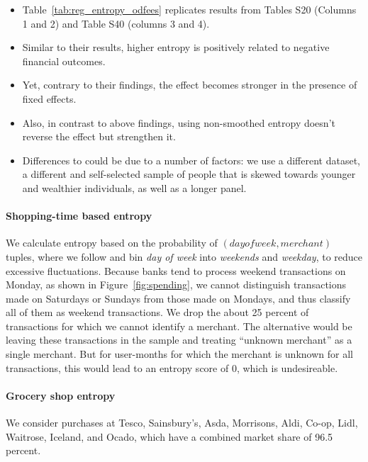\begin{itemize}

    \item Table~\ref{tab:reg_entropy_odfees} replicates results from
        \citet{muggleton2020evidence} Tables S20 (Columns 1 and 2) and Table
        S40 (columns 3 and 4).

    \item Similar to their results, higher entropy is positively related to
        negative financial outcomes.

    \item Yet, contrary to their findings, the effect becomes stronger in the
        presence of fixed effects.

    \item Also, in contrast to above findings, using non-smoothed entropy
        doesn't reverse the effect but strengthen it.

    \item Differences to \citet{muggleton2020evidence} could be due to a number
        of factors: we use a different dataset, a different and self-selected sample of people
        that is skewed towards younger and wealthier individuals, as well as a
        longer panel.

\end{itemize}




\paragraph{Shopping-time based entropy}
\label{par:shopping_time_based_entropy}

We calculate entropy based on the probability of $(day of week, merchant)$
tuples, where we follow \citet{guidotti2015behavioral} and bin \textit{day of
week} into \textit{weekends} and \textit{weekday}, to reduce excessive
fluctuations. Because banks tend to process weekend transactions on Monday, as
shown in Figure~\ref{fig:spending}, we cannot distinguish transactions made on
Saturdays or Sundays from those made on Mondays, and thus classify all of them
as weekend transactions. We drop the about 25 percent of transactions for which
we cannot identify a merchant. The alternative would be leaving these
transactions in the sample and treating ``unknown merchant'' as a single
merchant. But for user-months for which the merchant is unknown for all
transactions, this would lead to an entropy score of 0, which is undesireable.

\paragraph{Grocery shop entropy}%
\label{par:grocery_shop_entropy}

We consider purchases at Tesco, Sainsbury's, Asda, Morrisons, Aldi, Co-op,
Lidl, Waitrose, Iceland, and Ocado, which have a combined market share of 96.5
percent.

